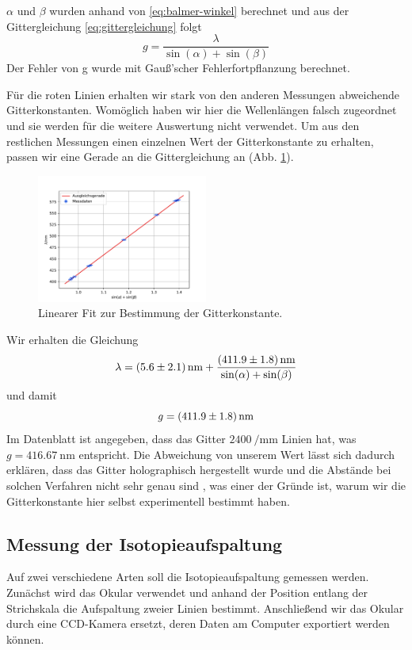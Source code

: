 \documentclass{article}
\begin{document}
$\alpha$ und $\beta$ wurden anhand von \eqref{eq:balmer-winkel} berechnet und aus der Gittergleichung \eqref{eq:gittergleichung} folgt
\[
  g = \frac{\lambda}{\sin(\alpha)+\sin(\beta)}
\]
Der Fehler von g wurde mit Gauß'scher Fehlerfortpflanzung berechnet.

Für die roten Linien erhalten wir stark von den anderen Messungen abweichende Gitterkonstanten.
Womöglich haben wir hier die Wellenlängen falsch zugeordnet und sie werden für die weitere Auswertung nicht verwendet.
Um aus den restlichen Messungen einen einzelnen Wert der Gitterkonstante zu erhalten, passen wir eine Gerade
an die Gittergleichung an (Abb. \ref{fig:fit-gitterkonstante}).
\begin{figure}[h]
  \centering
  \includegraphics[width=0.5\textwidth]{fit-gitterkonstante}
  \caption{Linearer Fit zur Bestimmung der Gitterkonstante.}
  \label{fig:fit-gitterkonstante}
\end{figure}
Wir erhalten die Gleichung
\[
  \lambda = \SI{5.6\pm2.1}{\nm} + \frac{\SI{411.9\pm1.8}{\nm}}{\sin(\alpha)+\sin(\beta)}
\]
und damit
\[
  g = \SI{411.9\pm1.8}{\nm}
\]
Im Datenblatt \cite{leybold-balmer} ist angegeben,
dass das Gitter $\SI{2400}{\per\mm}$ Linien hat, was $g = \SI{416.67}{\nm}$ entspricht.
Die Abweichung von unserem Wert lässt sich dadurch erklären, dass das Gitter holographisch hergestellt wurde und
die Abstände bei solchen Verfahren nicht sehr genau sind \cite{Anleitung}, was einer der Gründe ist,
warum wir die Gitterkonstante hier selbst experimentell bestimmt haben.


\subsection{Messung der Isotopieaufspaltung}
Auf zwei verschiedene Arten soll die Isotopieaufspaltung gemessen werden. Zunächst wird das Okular verwendet und anhand
der Position entlang der Strichskala die Aufspaltung zweier Linien bestimmt. Anschließend wir das Okular durch eine
CCD-Kamera ersetzt, deren Daten am Computer exportiert werden können.
\end{document}
